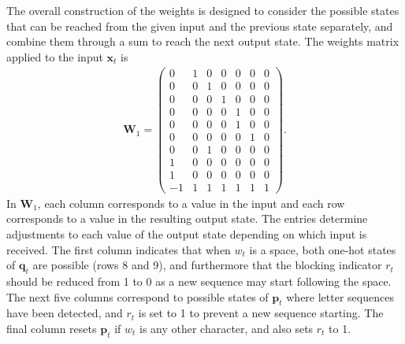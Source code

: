 \documentclass{somasmsc}
\begin{document}
The overall construction of the weights is designed to consider the possible states that can be reached from the given input and the previous state separately, and combine them through a sum to reach the next output state. The weights matrix applied to the input $\pmb{x}_t$ is
\begin{align*}
\mathbf{W}_1 =
\begin{pmatrix}
 0 & 1 & 0 & 0 & 0 & 0 & 0\\
 0 & 0 & 1 & 0 & 0 & 0 & 0\\
 0 & 0 & 0 & 1 & 0 & 0 & 0\\
 0 & 0 & 0 & 0 & 1 & 0 & 0\\
 0 & 0 & 0 & 0 & 1 & 0 & 0\\
 0 & 0 & 0 & 0 & 0 & 1 & 0\\
 0 & 0 & 1 & 0 & 0 & 0 & 0\\
 1 & 0 & 0 & 0 & 0 & 0 & 0\\
 1 & 0 & 0 & 0 & 0 & 0 & 0\\
-1 & 1 & 1 & 1 & 1 & 1 & 1
\end{pmatrix}.
\end{align*}
In $\mathbf{W}_1$, each column corresponds to a value in the input and each row corresponds to a value in the resulting output state. The entries determine adjustments to each value of the output state depending on which input is received. The first column indicates that when $w_t$ is a space, both one-hot states of $\pmb{q}_t$ are possible (rows 8 and 9), and furthermore that the blocking indicator $r_t$ should be reduced from 1 to 0 as a new sequence may start following the space. The next five columns correspond to possible states of $\pmb{p}_t$ where letter sequences have been detected, and $r_t$ is set to 1 to prevent a new sequence starting. The final column resets $\pmb{p}_t$ if $w_t$ is any other character, and also sets $r_t$ to 1.
\end{document}
